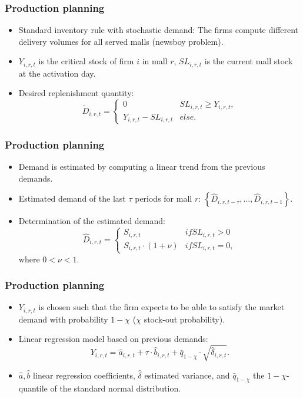 \documentclass{beamer}
\begin{document}
\frame
{
  \frametitle{Production planning} 
\begin{itemize}
	\item Standard inventory rule with stochastic demand: The firms compute different delivery volumes for all served malls (newsboy problem).
	
	\item $Y_{i,r,t}$ is the critical stock of firm $i$ in mall $r$, $SL_{i,r,t}$ is the current mall stock at the activation day.
		
	\item Desired replenishment quantity:
	\[
			\tilde{D}_{i,r,t}= \begin{cases} 0 & SL_{i,r,t}\geq Y_{i,r,t},\\
																			Y_{i,r,t} -  SL_{i,r,t} &else. 
			
			 \end{cases}
	\]
	
	
	\end{itemize}


}

\frame
{

  \frametitle{Production planning} 
\begin{itemize}

\item Demand is estimated by computing a linear trend from the previous demands.

\item Estimated demand of the last $\tau$ periods for mall $r$: $\left\{ \hat{D}_{i,r,t-\tau},...,\hat{D}_{i,r,t-1} \right\}$.

\item Determination of the estimated demand:  
		\[
				\hat{D}_{i,r,t}=\begin{cases}  S_{i,r,t} & if SL_{i,r,t}>0 \\ S_{i,r,t}\cdot (1+ \nu) & if SL_{i,r,t}=0, \end{cases}
		\]
		where $0 < \nu < 1$.
\end{itemize}
  
}


\frame
{
  \frametitle{Production planning} 
\begin{itemize}
	
	
	\item $Y_{i,r,t}$ is chosen such that the firm expects to be able to satisfy the market demand with probability $1-\chi$ ($\chi$ stock-out probability).
	
	\item Linear regression model based on previous demands:
	\[
			Y_{i,r,t}= \hat{a}_{i,r,t}+\tau \cdot \hat{b}_{i,r,t}+\bar{q}_{1-\chi}\cdot \sqrt{\hat{\delta}_{i,r,t}}.
	\]
	
	\item $\hat{a}, \hat{b}$ linear regression coefficients, $\hat{\delta}$ estimated variance, and $\bar{q}_{1-\chi}$ the $1-\chi$-quantile of the standard normal distribution. 
	\end{itemize}


}
\end{document}
